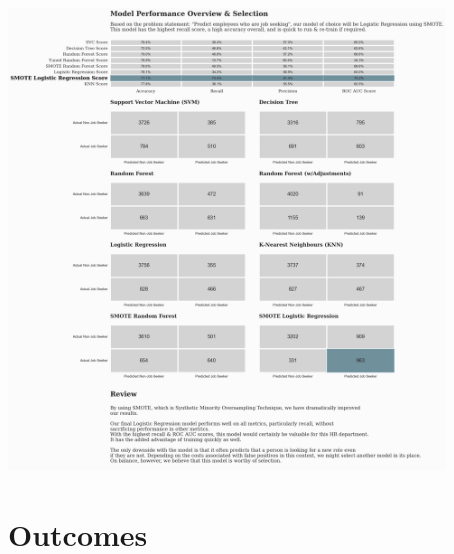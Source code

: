 \begin{center}
\includegraphics[width=0.87\textwidth]{download-2}
\end{center}

\pagebreak

\section{Outcomes}

